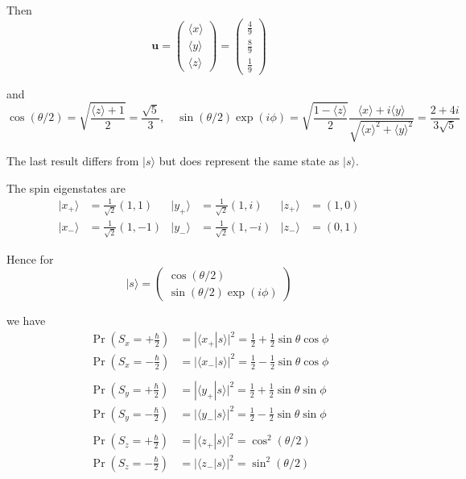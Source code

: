 Then
\begin{equation*}
\mathbf u
=\begin{pmatrix}\langle x\rangle\\\langle y\rangle\\\langle z\rangle\end{pmatrix}
=\begin{pmatrix}\frac{4}{9}\\[1ex]\frac{8}{9}\\[1ex]\frac{1}{9}\end{pmatrix}
\end{equation*}

and
\begin{equation*}
\cos(\theta/2)=\sqrt{\frac{\langle z\rangle+1}{2}}=\frac{\sqrt5}{3},\quad
\sin(\theta/2)\exp(i\phi)=\sqrt{\frac{1-\langle z\rangle}{2}}
\frac{\langle x\rangle+i\langle y\rangle}{\sqrt{\langle x\rangle^2+\langle y\rangle^2}}
=\frac{2+4i}{3\sqrt5}
\end{equation*}

The last result differs from $|s\rangle$ but does represent the same state as $|s\rangle$.

\bigskip
The spin eigenstates are
\begin{align*}
|x_+\rangle&=\tfrac{1}{\sqrt2}(1,1) &
|y_+\rangle&=\tfrac{1}{\sqrt2}(1,i) &
|z_+\rangle&=(1,0)
\\
|x_-\rangle&=\tfrac{1}{\sqrt2}(1,-1) &
|y_-\rangle&=\tfrac{1}{\sqrt2}(1,-i) &
|z_-\rangle&=(0,1)
\end{align*}

Hence for
\begin{equation*}
|s\rangle=\begin{pmatrix}\cos(\theta/2)\\\sin(\theta/2)\exp(i\phi)\end{pmatrix}
\end{equation*}

we have
\begin{align*}
\Pr\left(S_x=+\tfrac{\hbar}{2}\right)
&=|\langle x_+|s\rangle|^2=\tfrac{1}{2}+\tfrac{1}{2}\sin\theta\cos\phi
\\
\Pr\left(S_x=-\tfrac{\hbar}{2}\right)
&=|\langle x_-|s\rangle|^2=\tfrac{1}{2}-\tfrac{1}{2}\sin\theta\cos\phi
\\
\\
\Pr\left(S_y=+\tfrac{\hbar}{2}\right)
&=|\langle y_+|s\rangle|^2=\tfrac{1}{2}+\tfrac{1}{2}\sin\theta\sin\phi
\\
\Pr\left(S_y=-\tfrac{\hbar}{2}\right)
&=|\langle y_-|s\rangle|^2=\tfrac{1}{2}-\tfrac{1}{2}\sin\theta\sin\phi
\\
\\
\Pr\left(S_z=+\tfrac{\hbar}{2}\right)
&=|\langle z_+|s\rangle|^2=\cos^2(\theta/2)
\\
\Pr\left(S_z=-\tfrac{\hbar}{2}\right)
&=|\langle z_-|s\rangle|^2=\sin^2(\theta/2)
\end{align*}


